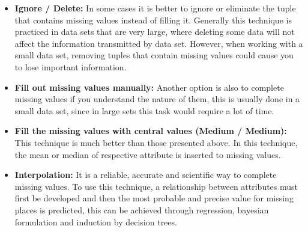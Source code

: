 \begin{itemize}
\item \textbf{Ignore / Delete:} In some cases it is better to ignore or eliminate the tuple that contains missing values instead of filling it. Generally this technique is practiced in data sets that are very large, where deleting some data will not affect the information transmitted by data set. However, when working with a small data set, removing tuples that contain missing values could cause you to lose important information.

\item \textbf{Fill out missing values manually:} Another option is also to complete  missing values if you understand the nature of them, this is usually done in a small data set, since in large sets this task would require a lot of time.

\item \textbf{Fill the missing values with central values (Medium / Medium):} This technique is much better than those presented above. In this technique, the mean or median of respective attribute is inserted to missing values.

\item \textbf{Interpolation:} It is a reliable, accurate and scientific way to complete missing values. To use this technique, a relationship between attributes must first be developed and then the most probable and precise value for missing places is predicted, this can be achieved through regression, bayesian formulation and induction by decision trees.

\end{itemize}

